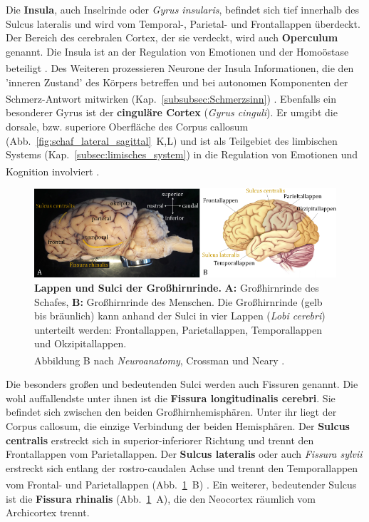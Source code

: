 \documentclass[12pt,a4paper,pdftex]{article}
\begin{document}
\noindent Die \textbf{Insula}, auch Inselrinde oder \textit{Gyrus insularis}, befindet sich tief innerhalb des Sulcus lateralis und wird vom Temporal-, Parietal- und Frontallappen überdeckt. Der Bereich des cerebralen Cortex, der sie verdeckt, wird auch \textbf{Operculum} genannt. Die Insula ist an der Regulation von Emotionen und der Homoöstase beteiligt \textsuperscript{\cite[15]{kandel2013principles}}. Des Weiteren prozessieren Neurone der Insula Informationen, die den 'inneren Zustand' des Körpers betreffen und bei autonomen Komponenten der Schmerz-Antwort mitwirken (Kap.~\ref{subsubsec:Schmerzsinn}) \textsuperscript{\cite[24]{kandel2013principles}}. Ebenfalls ein besonderer Gyrus ist der \textbf{cinguläre Cortex} (\textit{Gyrus cinguli}). Er umgibt die dorsale, bzw. superiore Oberfläche des Corpus callosum (Abb.~\ref{fig:schaf_lateral_sagittal}~K,L) und ist als Teilgebiet des limbischen Systems (Kap.~\ref{subsec:limisches_system}) in die Regulation von Emotionen und Kognition involviert \textsuperscript{\cite[15]{kandel2013principles}}.

\begin{figure}[H]
	\centering
	\includegraphics[width=\textwidth]{pictures/Bilder_Jule/Andere/grosshirnrinde.png}
	\caption[Lappen und Sulci der Großhirnrinde]{\textbf{Lappen und Sulci der Großhirnrinde.} \textbf{A:} Großhirnrinde des Schafes, \textbf{B:} Großhirnrinde des Menschen. Die Großhirnrinde (gelb bis bräunlich) kann anhand der Sulci in vier Lappen (\textit{Lobi cerebri}) unterteilt werden: Frontallappen, Parietallappen, Temporallappen und Okzipitallappen. \\
	Abbildung B nach \textit{Neuroanatomy}, Crossman und Neary \textsuperscript{\cite[7]{crossman2014neuroanatomy}}.}
	\label{fig:cortex_lappen} 
\end{figure}

\noindent Die besonders großen und bedeutenden Sulci werden auch Fissuren genannt. Die wohl auffallendste unter ihnen ist die \textbf{Fissura longitudinalis cerebri}. Sie befindet sich zwischen den beiden Großhirnhemisphären. Unter ihr liegt der Corpus callosum, die einzige Verbindung der beiden Hemisphären. Der \textbf{Sulcus centralis} erstreckt sich in superior-inferiorer Richtung und trennt den Frontallappen vom Parietallappen. Der \textbf{Sulcus lateralis} oder auch \textit{Fissura sylvii} erstreckt sich entlang der rostro-caudalen Achse und trennt den Temporallappen vom Frontal- und Parietallappen (Abb.~\ref{fig:cortex_lappen}~B) \textsuperscript{\cite[7]{neurowissenschaften_baer}}. Ein weiterer, bedeutender Sulcus ist die \textbf{Fissura rhinalis} (Abb.~\ref{fig:cortex_lappen}~A), die den Neocortex räumlich vom Archicortex trennt. 
\end{document}
